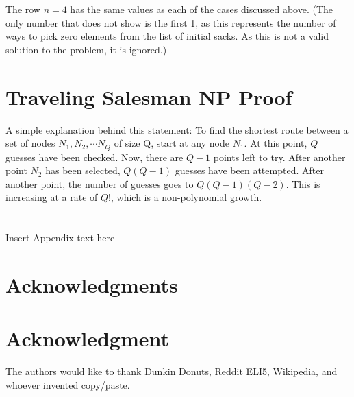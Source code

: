 \documentclass[10pt,journal,compsoc]{IEEEtran}
\begin{document}
\begin{itemize}
	The row $n=4$ has the same values as each of the cases discussed above. (The only number that does not show is the first 1, as this represents the number of ways to pick zero elements from the list of initial sacks. As this is not a valid solution to the problem, it is ignored.)
\end{itemize}

\section{Traveling Salesman NP Proof}
A simple explanation behind this statement: To find the shortest route between a set of nodes $N_1,N_2,\cdots N_Q$ of size Q, start at any node $N_1$. At this point, $Q$ guesses have been checked. Now, there are $Q-1$ points left to try. After another point $N_2$ has been selected, $Q(Q-1)$ guesses have been attempted. After another point, the number of guesses goes to $Q(Q-1)(Q-2)$. This is increasing at a rate of $Q!$, which is a non-polynomial growth.

\section{}
Insert Appendix text here
\ifCLASSOPTIONcompsoc
  \section*{Acknowledgments}
\else
  \section*{Acknowledgment}
\fi


The authors would like to thank Dunkin Donuts, Reddit ELI5, Wikipedia, and whoever invented copy/paste. 


\ifCLASSOPTIONcaptionsoff
  \newpage
\fi



\end{document}
